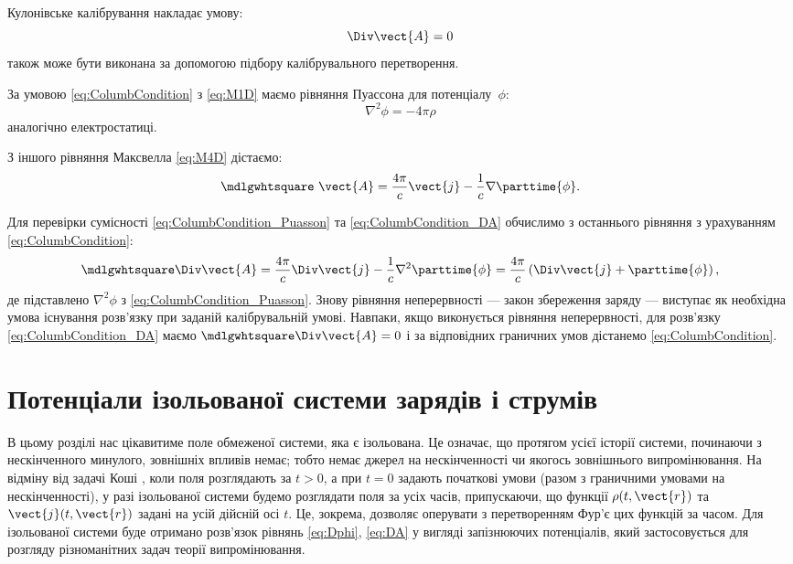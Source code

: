 Кулонівське калібрування накладає умову:
\begin{equation}\label{eq:ColumbCondition}
	\Div \vect{A} = 0
\end{equation}
також може бути виконана за допомогою підбору калібрувального
перетворення.

За умовою \eqref{eq:ColumbCondition} з \eqref{eq:M1D} маємо рівняння Пуассона для потенціалу~$\phi$:
\begin{equation}\label{eq:ColumbCondition_Puasson}
	\nabla^2 \phi = -4\pi \rho
\end{equation}
аналогічно електростатиці.

З іншого рівняння Максвелла \eqref{eq:M4D} дістаємо:
\begin{equation}\label{eq:ColumbCondition_DA}
	\mdlgwhtsquare\ \vect{A} = \frac{4\pi}c \vect{j} - \frac1c \nabla \parttime{\phi}.
\end{equation}

Для перевірки сумісності \eqref{eq:ColumbCondition_Puasson} та \eqref{eq:ColumbCondition_DA} обчислимо з останнього рівняння з
урахуванням \eqref{eq:ColumbCondition}:
\begin{equation*}
	\mdlgwhtsquare\Div\vect{A} = \frac{4\pi}c \Div\vect{j} - \frac1c \nabla^2 \parttime{\phi} = \frac{4\pi}c\left( \Div\vect{j} +
	\parttime{\phi}\right),
\end{equation*}
де підставлено $\nabla^2\phi$ з \eqref{eq:ColumbCondition_Puasson}. Знову рівняння неперервності --- закон збереження
заряду --- виступає як необхідна умова існування розв’язку при заданій
калібрувальній умові. Навпаки, якщо виконується рівняння неперервності, для
розв’язку \eqref{eq:ColumbCondition_DA} маємо $\mdlgwhtsquare\Div\vect{A} = 0$ і за відповідних граничних умов
дістанемо \eqref{eq:ColumbCondition}.

\section{Потенціали ізольованої системи зарядів і струмів}



В цьому розділі нас цікавитиме поле обмеженої системи, яка є ізольована. Це означає, що протягом усієї історії системи, починаючи з нескінченного
минулого, зовнішніх впливів немає; тобто немає джерел на нескінченності чи якогось зовнішнього випромінювання. На відміну від задачі Коші , коли поля
розглядають за $t >0$, а при $t =0$ задають початкові умови (разом з граничними умовами на нескінченності), у разі ізольованої системи будемо розглядати
поля за усіх часів, припускаючи, що функції $\rho(t, \vect{r})$ та $\vect{j}(t, \vect{r})$ задані на усій дійсній осі $t$. Це, зокрема, дозволяє
оперувати з перетворенням Фур’є цих функцій за часом. Для ізольованої системи буде отримано розв’язок рівнянь \eqref{eq:Dphi}, \eqref{eq:DA} у вигляді
запізнюючих потенціалів, який застосовується для розгляду різноманітних задач теорії випромінювання.


